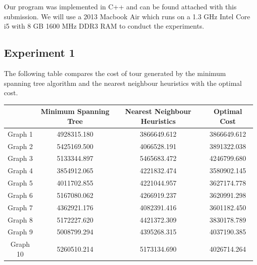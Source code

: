 \documentclass[paper=a4, fontsize=11pt]{scrartcl}	%
\numberwithin{equation}{section}		%
\numberwithin{figure}{section}			%
\numberwithin{table}{section}				%
\begin{document}
Our program was implemented in C++ and can be found attached with this submission. We will use a 2013 Macbook Air which runs on a 1.3 GHz Intel Core i5 with 8 GB 1600 MHz DDR3 RAM to conduct the experiments. 

\subsection{Experiment 1}
The following table compares the cost of tour generated by the minimum spanning tree algorithm and the nearest neighbour heuristics with the optimal cost.
\begin{center}

\begin{tabular}{|c|c|c|c|}
\hline 
 & Minimum Spanning Tree & Nearest Neighbour Heuristics & Optimal Cost \\ 
\hline 
Graph 1 & 4928315.180 & 3866649.612 & 3866649.612 \\ 
\hline 
Graph 2 & 5425169.500 & 4066528.191 & 3891322.038 \\ 
\hline 
Graph 3 & 5133344.897 & 5465683.472 & 4246799.680 \\ 
\hline 
Graph 4 & 3854912.065 & 4221832.474 & 3580902.145 \\ 
\hline 
Graph 5 & 4011702.855 & 4221044.957 & 3627174.778 \\ 
\hline 
Graph 6 & 5167080.062 & 4266919.237 & 3620991.298 \\ 
\hline 
Graph 7 & 4362921.176 & 4082391.416 & 3601182.450 \\ 
\hline 
Graph 8 & 5172227.620 & 4421372.309 & 3830178.789 \\ 
\hline 
Graph 9 & 5008799.294 & 4395268.315 & 4037190.385 \\ 
\hline 
Graph 10 & 5260510.214 & 5173134.690 & 4026714.264 \\ 
\hline 
\end{tabular} 
\end{center}
\end{document}
